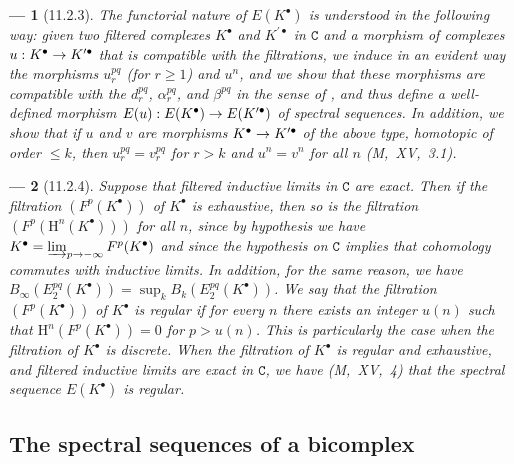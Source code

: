 \documentclass[oneside]{amsart}
\theoremstyle{ega-env-style}
\newtheorem*{env}{---}
\theoremstyle{ega-thm-env-style}
\theoremstyle{ega-defn-env-style}
\def\cat{\mathtt}                   %
\def\leq{\leqslant}                 %
\def\geq{\geqslant}                 %
\def\HH{\mathrm{H}}                 %
\renewcommand{\to}{\mathchoice{\longrightarrow}{\rightarrow}{\rightarrow}{\rightarrow}}
\newcommand{\oldpage}[2][]{{\marginnote{\normalfont{\textbf{#1}~|~#2}}}\ignorespaces}
\let\EGAOriginalLabel\label
\renewcommand{\label}[1]{\phantomsection\EGAOriginalLabel{#1}}
\begin{document}
\begin{env}[11.2.3]
\label{0.11.2.3}
The \emph{functorial} nature of $E(K^\bullet)$ is understood in the following way: given two \emph{filtered} complexes $K^\bullet$ and $K^{\prime\bullet}$ in $\cat{C}$ and a morphism of complexes $u:K^\bullet\to K^{\prime\bullet}$ that is \emph{compatible with the filtrations}, we induce in an evident way the morphisms $u_r^{pq}$ (for $r\geq 1$) and $u^n$, and we show that these morphisms are compatible with the $d_r^{pq}$, $\alpha_r^{pq}$, and $\beta^{pq}$ in the sense of , and thus define a well-defined morphism $E(u):E(K^\bullet)\to E(K^{\prime\bullet})$ of spectral sequences.
In addition, we show that if $u$ and $v$ are morphisms $K^\bullet\to K^{\prime\bullet}$ of the above type, \emph{homotopic of order $\leq k$}, then $u_r^{pq}=v_r^{pq}$ for $r>k$ and $u^n=v^n$ for all $n$ (M,~XV,~3.1).
\end{env}

\begin{env}[11.2.4]
\label{0.11.2.4}
\oldpage[0\textsubscript{III}]{29}
Suppose that filtered inductive limits in $\cat{C}$ are exact.
Then if the filtration $(F^p(K^\bullet))$ of $K^\bullet$ is \emph{exhaustive}, then so is the filtration $(F^p(\HH^n(K^\bullet)))$ for all $n$, since by hypothesis we have $K^\bullet=\varinjlim_{p\to-\infty}F^p(K^\bullet)$ and since the hypothesis on $\cat{C}$ implies that cohomology commutes with inductive limits.
In addition, for the same reason, we have $B_\infty(E_2^{pq}(K^\bullet))=\sup_k B_k(E_2^{pq}(K^\bullet))$.
We say that the filtration $(F^p(K^\bullet))$ of $K^\bullet$ is \emph{regular} if for every $n$ there exists an integer $u(n)$ such that $\HH^n(F^p(K^\bullet))=0$ for $p>u(n)$.
This is particularly the case when the filtration of $K^\bullet$ is \emph{discrete}.
When the filtration of $K^\bullet$ is regular and exhaustive, and filtered inductive limits are exact in $\cat{C}$, we have (M,~XV,~4) that the spectral sequence $E(K^\bullet)$ is \emph{regular}.
\end{env}

\subsection{The spectral sequences of a bicomplex}
\label{subsection:0.11.3}
\end{document}
